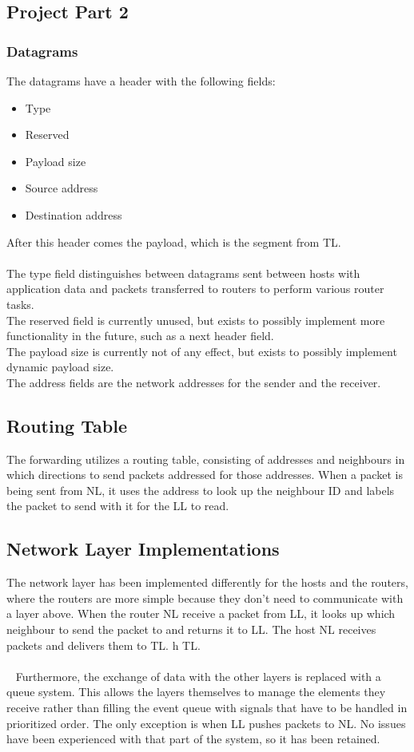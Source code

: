 \subsection{Project Part 2}
\subsubsection{Datagrams}
\label{sec:DATAGRAM}
The datagrams have a header with the following fields:
\begin{itemize}
\item Type
\item Reserved
\item Payload size
\item Source address
\item Destination address
\end{itemize}

After this header comes the payload, which is the segment from TL.\\
\\
The type field distinguishes between datagrams sent between hosts with application data and packets transferred to routers to perform various router tasks.\\
The reserved field is currently unused, but exists to possibly implement more functionality in the future, such as a next header field.\\
The payload size is currently not of any effect, but exists to possibly implement dynamic payload size.\\
The address fields are the network addresses for the sender and the receiver.

\subsection{Routing Table}
The forwarding utilizes a routing table, consisting of addresses and neighbours in which directions to send packets addressed for those addresses. When a packet is being sent from NL, it uses the address to look up the neighbour ID and labels the packet to send with it for the LL to read.

\subsection{Network Layer Implementations}
The network layer has been implemented differently for the hosts and the routers, where the routers are more simple because they don't need to communicate with a layer above. When the router NL receive a packet from LL, it looks up which neighbour to send the packet to and returns it to LL. The host NL receives packets and delivers them to TL.
h TL.\\
\\~
Furthermore, the exchange of data with the other layers is replaced with a queue system. This allows the layers themselves to manage the elements they receive rather than filling the event queue with signals that have to be handled in prioritized order. The only exception is when LL pushes packets to NL. No issues have been experienced with that part of the system, so it has been retained.





